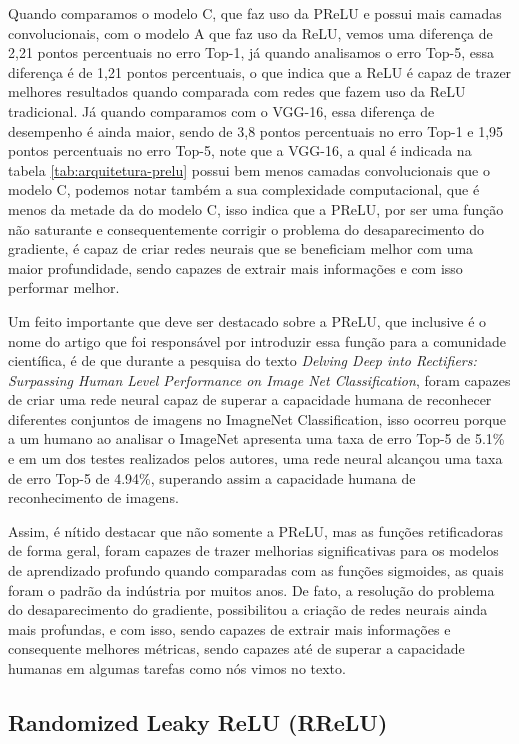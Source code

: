 Quando comparamos o modelo C, que faz uso da PReLU e possui mais camadas convolucionais, com o modelo A que faz uso da ReLU, vemos uma diferença de 2,21 pontos percentuais no erro Top-1, já quando analisamos o erro Top-5, essa diferença é de 1,21 pontos percentuais, o que indica que a ReLU é capaz de trazer melhores resultados quando comparada com redes que fazem uso da ReLU tradicional. Já quando comparamos com o VGG-16, essa diferença de desempenho é ainda maior, sendo de 3,8 pontos percentuais no erro Top-1 e 1,95 pontos percentuais no erro Top-5, note que a VGG-16, a qual é indicada na tabela \ref{tab:arquitetura-prelu} possui bem menos camadas convolucionais que o modelo C, podemos notar também a sua complexidade computacional, que é menos da metade da do modelo C, isso indica que a PReLU, por ser uma função não saturante e consequentemente corrigir o problema do desaparecimento do gradiente, é capaz de criar redes neurais que se beneficiam melhor com uma maior profundidade, sendo capazes de extrair mais informações e com isso performar melhor.

Um feito importante que deve ser destacado sobre a PReLU, que inclusive é o nome do artigo que foi responsável por introduzir essa função para a comunidade científica, é de que durante a pesquisa do texto \textit{Delving Deep into Rectifiers: Surpassing Human Level Performance on Image Net Classification}, \textcite{PReLUArticle} foram capazes de criar uma rede neural capaz de superar a capacidade humana de reconhecer diferentes conjuntos de imagens no ImagneNet Classification, isso ocorreu porque a um humano ao analisar o ImageNet apresenta uma taxa de erro Top-5 de 5.1\% e em um dos testes realizados pelos autores, uma rede neural alcançou uma taxa de erro Top-5 de 4.94\%, superando assim a capacidade humana de reconhecimento de imagens. 

Assim, é nítido destacar que não somente a PReLU, mas as funções retificadoras de forma geral, foram capazes de trazer melhorias significativas para os modelos de aprendizado profundo quando comparadas com as funções sigmoides, as quais foram o padrão da indústria por muitos anos. De fato, a resolução do problema do desaparecimento do gradiente, possibilitou a criação de redes neurais ainda mais profundas, e com isso, sendo capazes de extrair mais informações e consequente melhores métricas, sendo capazes até de superar a capacidade humanas em algumas tarefas como nós vimos no texto.

\subsection{Randomized Leaky ReLU (RReLU)}

